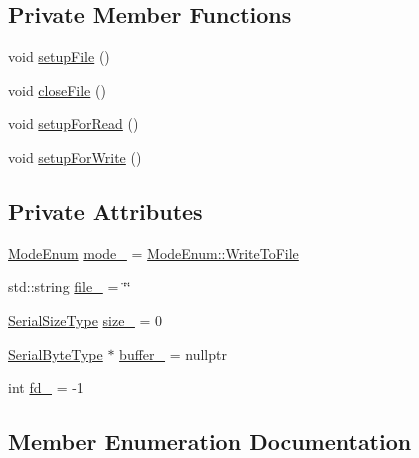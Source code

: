 \subsection*{Private Member Functions}
\begin{DoxyCompactItemize}
\item 
void \hyperlink{structcheckpoint_1_1buffer_1_1_i_o_buffer_a0da2b3a73fbd75c1837a6ef8c9506d76}{setup\+File} ()
\item 
void \hyperlink{structcheckpoint_1_1buffer_1_1_i_o_buffer_a959990ab99e72d5a7df854582ecd83b2}{close\+File} ()
\item 
void \hyperlink{structcheckpoint_1_1buffer_1_1_i_o_buffer_ab5de5a8bdf95ad3d98438b109c220436}{setup\+For\+Read} ()
\item 
void \hyperlink{structcheckpoint_1_1buffer_1_1_i_o_buffer_a254d81d8ca0ffce817768d5dd88eb996}{setup\+For\+Write} ()
\end{DoxyCompactItemize}
\subsection*{Private Attributes}
\begin{DoxyCompactItemize}
\item 
\hyperlink{structcheckpoint_1_1buffer_1_1_i_o_buffer_a17af037ab505e902bc6133309a92ded2}{Mode\+Enum} \hyperlink{structcheckpoint_1_1buffer_1_1_i_o_buffer_af8900a31606fe8f7bc03d61a7ce3d4e1}{mode\+\_\+} = \hyperlink{structcheckpoint_1_1buffer_1_1_i_o_buffer_a17af037ab505e902bc6133309a92ded2aa91ea5238090273cea8d2e0b0bed7540}{Mode\+Enum\+::\+Write\+To\+File}
\item 
std\+::string \hyperlink{structcheckpoint_1_1buffer_1_1_i_o_buffer_a3032074c49298bf2d87aeb5f7aa5f37d}{file\+\_\+} = \char`\"{}\char`\"{}
\item 
\hyperlink{namespacecheckpoint_a083f6674da3f94c2901b18c6d238217c}{Serial\+Size\+Type} \hyperlink{structcheckpoint_1_1buffer_1_1_i_o_buffer_a33fee533bb344b3525bfffae726cb0d0}{size\+\_\+} = 0
\item 
\hyperlink{namespacecheckpoint_ae57f01cdc0b81776c23b6c7c934c58f5}{Serial\+Byte\+Type} $\ast$ \hyperlink{structcheckpoint_1_1buffer_1_1_i_o_buffer_a2417e2231e491d55411ea0128275b855}{buffer\+\_\+} = nullptr
\item 
int \hyperlink{structcheckpoint_1_1buffer_1_1_i_o_buffer_aaae9d622f010fb34e3644ae7ffc355d7}{fd\+\_\+} = -\/1
\end{DoxyCompactItemize}


\subsection{Member Enumeration Documentation}
\mbox{\label{structcheckpoint_1_1buffer_1_1_i_o_buffer_a17af037ab505e902bc6133309a92ded2}} 
